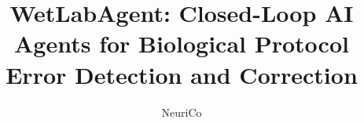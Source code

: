 \documentclass{article}
\title{%
  \textbf{WetLabAgent}: Closed-Loop AI Agents for Biological Protocol\\
  Error Detection and Correction
}
\author{NeuriCo}
\begin{document}
\maketitle

\begin{abstract}

\end{abstract}










\end{document}
